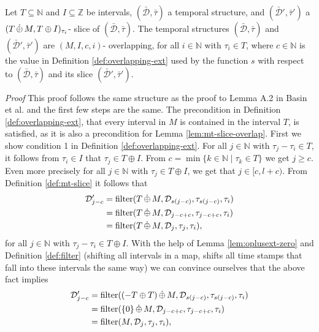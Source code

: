 \begin{lemma}
    \label{lem:mt-slice-overlap}
    Let $T \subseteq \mathbb{N}$ and $I \subseteq \mathbb{Z}$ be intervals, 
    $(\bar{\mathcal{D}}, \bar{\tau})$ a temporal structure, and $(\bar{\mathcal{D}}', \bar{\tau}')$ a $(T \,\dot{\oplus}\, M, T \oplus I)_{\tau_i}$- slice of $(\bar{\mathcal{D}}, \bar{\tau})$.
    The temporal structures $(\bar{\mathcal{D}}, \bar{\tau})$ and $(\bar{\mathcal{D}}', \bar{\tau}')$ are $(M,I,c,i)$- overlapping, for all $i \in \mathbb{N}$ with $\tau_i \in T$, where $c \in \mathbb{N}$ is the value in Definition \ref{def:overlapping-ext} used by the function $s$ with respect to $(\bar{\mathcal{D}}, \bar{\tau})$ and its slice $(\bar{\mathcal{D}}', \bar{\tau}')$.
\end{lemma}
\textit{Proof}
This proof follows the same structure as the proof to Lemma A.2 in Basin et al. \cite{Basin2016} and the first few steps are the same.
The precondition in Definition \ref{def:overlapping-ext}, that every interval in $M$ is contained in the interval $T$, is satisfied, as it is also a precondition for Lemma \ref{lem:mt-slice-overlap}.
First we show condition 1 in Definition \ref{def:overlapping-ext}.
For all $j \in \mathbb{N}$ with $\tau_j - \tau_i \in T$, it follows from $\tau_i \in I$ that $\tau_j \in T \oplus I$.
From $c = \min\{k \in \mathbb{N} \mid \tau_k \in T \}$ we get $j \geq c$.
Even more precisely  for all $j \in \mathbb{N}$ with $\tau_j \in T \oplus I$, we get that $j \in [c, l+c)$.
From Definition \ref{def:mt-slice} it follows that
\begin{align*}
    \mathcal{D}'_{j-c}
    & = \operatorname{filter}(T \,\dot{\oplus}\, M, \mathcal{D}_{s(j-c)}, \tau_{s(j-c)}, \tau_i) \\
    & = \operatorname{filter}(T \,\dot{\oplus}\, M, \mathcal{D}_{j-c+c}, \tau_{j-c+c}, \tau_i) \\
    & = \operatorname{filter}(T \,\dot{\oplus}\, M, \mathcal{D}_{j}, \tau_{j}, \tau_i), 
\end{align*}
for all $j \in \mathbb{N}$ with $\tau_j - \tau_i \in T \oplus I$.
With the help of Lemma \ref{lem:oplusext-zero} and Definition \ref{def:filter} (shifting all intervals in a map, shifts all time stamps that fall into these intervals the same way) we can convince ourselves that the above fact implies
\begin{align*}
    \mathcal{D}'_{j-c}
    & = \operatorname{filter}((-T \oplus T) \,\dot{\oplus}\, M, \mathcal{D}_{s(j-c)}, \tau_{s(j-c)}, \tau_i) \\
    & = \operatorname{filter}(\{0\} \,\dot{\oplus}\, M, \mathcal{D}_{j-c+c}, \tau_{j-c+c}, \tau_i) \\
    & = \operatorname{filter}(M, \mathcal{D}_{j}, \tau_{j}, \tau_i), 
\end{align*}
